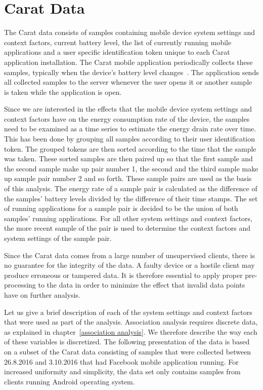 \section{Carat Data} \label{carat data}

The Carat data consists of samples containing mobile device system settings and context factors, current battery level, the list of currently running mobile applications and a user specific identification token unique to each Carat application installation. The Carat mobile application periodically collects these samples, typically when the device's battery level changes~\cite{Oliner:2013:CCE:2517351.2517354}. The application sends all collected samples to the server whenever the user opens it or another sample is taken while the application is open.

Since we are interested in the effects that the mobile device system settings and context factors have on the energy consumption rate of the device, the samples need to be examined as a time series to estimate the energy drain rate over time. This has been done by grouping all samples according to their user identification token. The grouped tokens are then sorted according to the time that the sample was taken. These sorted samples are then paired up so that the first sample and the second sample make up pair number 1, the second and the third sample make up sample pair number 2 and so forth. These sample pairs are used as the basis of this analysis. The energy rate of a sample pair is calculated as the difference of the samples' battery levels divided by the difference of their time stamps. The set of running applications for a sample pair is decided to be the union of both samples' running applications. For all other system settings and context factors, the more recent sample of the pair is used to determine the context factors and system settings of the sample pair.

Since the Carat data comes from a large number of unsupervised clients, there is no guarantee for the integrity of the data. A faulty device or a hostile client may produce erroneous or tampered data. It is therefore essential to apply proper pre-processing to the data in order to minimize the effect that invalid data points have on further analysis. 

Let us give a brief description of each of the system settings and context factors that were used as part of the analysis. Association analysis requires discrete data, as explained in chapter~\ref{association analysis}. We therefore describe the way each of these variables is discretized. The following presentation of the data is based on a subset of the Carat data consisting of samples that were collected between 26.8.2016 and 3.10.2016 that had Facebook mobile application running. For increased uniformity and simplicity, the data set only contains samples from clients running Android operating system. 

